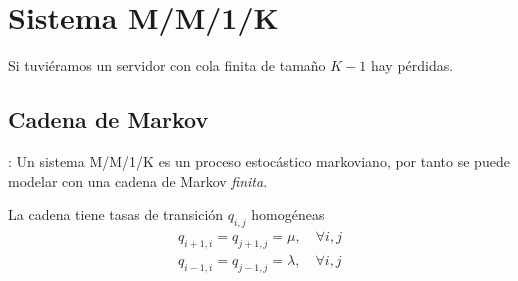 \documentclass[xcolor={x11names}]{beamer}
\begin{document}
\section{Sistema M/M/1/K}
\begin{frame}{\secname}
    Si tuviéramos un servidor con cola
    finita de tamaño $K-1$ hay pérdidas.
    \begin{figure}
        
    \end{figure}
\end{frame}





\subsection{Cadena de Markov}
\begin{frame}{\secname: \subsecname}
    Un sistema M/M/1/K es un proceso
    estocástico markoviano, por tanto
    se puede modelar con una cadena
    de Markov \emph{finita}.
    \begin{figure}
        \resizebox{!}{.15\textwidth}{%
            
        }
    \end{figure}
    La cadena tiene tasas
    de transición $q_{i,j}$ homogéneas
    \begin{align*}
        q_{i+1,i}=q_{j+1,j}=\mu,\quad \forall i,j\\
        q_{i-1,i}=q_{j-1,j}=\lambda,\quad \forall i,j\\
    \end{align*}
    \begin{figure}
        \resizebox{!}{.15\textwidth}{%
            
        }
    \end{figure}
\end{frame}
\end{document}
